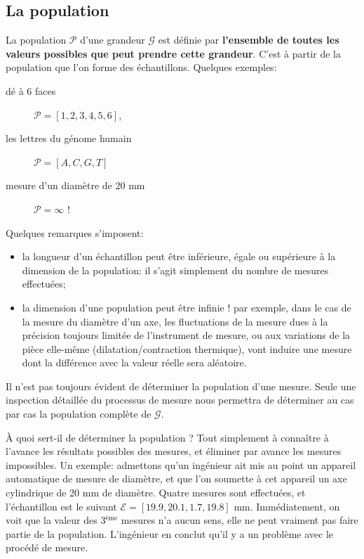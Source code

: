 \subsection{La population}

La population $\mathcal{P}$ d'une grandeur $\mathcal{G}$ est définie par \textbf{l'ensemble de toutes les valeurs possibles que peut prendre cette grandeur}. C'est à partir de la population que l'on forme des échantillons. Quelques exemples:
\begin{description}
    \item[dé à 6 faces] $\mathcal{P}=[1,2,3,4,5,6]$,
    \item[les lettres du génome humain] $\mathcal{P}=[A,C,G,T]$
    \item[mesure d'un diamètre de 20 mm] $\mathcal{P}=\infty$ !
\end{description}
Quelques remarques s'imposent:
\begin{itemize}
    \item la longueur d'un échantillon peut être inférieure, égale ou supérieure à la dimension de la population: il s'agit simplement du nombre de mesures effectuées;
    \item la dimension d'une population peut être infinie ! par exemple, dans le cas de la mesure du diamètre d'un axe, les fluctuations de la mesure dues à la précision toujours limitée de l'instrument de mesure, ou aux variations de la pièce elle-même (dilatation/contraction thermique), vont induire une mesure dont la différence avec la valeur réelle sera aléatoire.
\end{itemize}
Il n'est pas toujours évident de déterminer la population d'une mesure. Seule une inspection détaillée du processus de mesure nous permettra de déterminer au cas par cas la population complète de $\mathcal{G}$.

À quoi sert-il de déterminer la population ? Tout simplement à connaître à l'avance les résultats possibles des mesures, et éliminer par avance les mesures impossibles. Un exemple: admettons qu'un ingénieur ait mis au point un appareil automatique de mesure de diamètre, et que l'on soumette à cet appareil un axe cylindrique de 20 mm de diamètre. Quatre mesures sont effectuées, et l'échantillon est le suivant $\mathcal{E}=[19.9,20.1,1.7,19.8]$ mm. Immédiatement, on voit que la valeur des 3$^\text{ème}$ mesures n'a aucun sens, elle ne peut vraiment pas faire partie de la population. L'ingénieur en conclut qu'il y a un problème avec le procédé de mesure.

